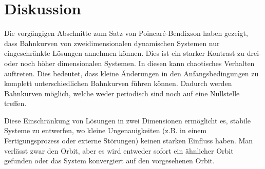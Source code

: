 \section{Diskussion} \label{poinbendix:section:diskussion}
Die vorgängigen Abschnitte zum Satz von Poincaré-Bendixson haben gezeigt, dass Bahnkurven von zweidimensionalen dynamischen Systemen nur eingeschränkte Lösungen annehmen können.
Dies ist ein starker Kontrast zu drei- oder noch höher dimensionalen Systemen.
In diesen kann chaotisches Verhalten auftreten.
Dies bedeutet, dass kleine Änderungen in den Anfangsbedingungen zu komplett unterschiedlichen Bahnkurven führen können.
Dadurch werden Bahnkurven möglich, welche weder periodisch sind noch auf eine Nullstelle treffen.

Diese Einschränkung von Lösungen in zwei Dimensionen ermöglicht es, stabile Systeme zu entwerfen, wo kleine Ungenauigkeiten (z.B. in einem Fertigungsprozess oder externe Störungen) keinen starken Einfluss haben.
%
Man verlässt zwar den Orbit, aber es wird entweder sofort ein ähnlicher Orbit gefunden oder das System konvergiert auf den vorgesehenen Orbit.
%

